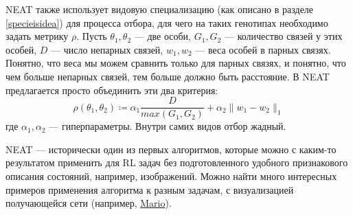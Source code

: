 \begin{example}
NEAT также использует видовую специализацию (как описано в разделе \ref{specieisidea}) для процесса отбора, для чего на таких генотипах необходимо задать метрику $\rho$. Пусть $\theta_1, \theta_2$ --- две особи, $G_1, G_2$ --- количество связей у этих особей, $D$ --- число непарных связей, $w_1, w_2$ --- веса особей в парных связях. Понятно, что веса мы можем сравнить только для парных связях, и понятно, что чем больше непарных связей, тем больше должно быть расстояние. В NEAT предлагается просто объединить эти два критерия: 
$$\rho(\theta_1, \theta_2) \coloneqq \alpha_1 \frac{D}{max(G_1, G_2)} + \alpha_2 \|w_1 - w_2\|_1$$
где $\alpha_1, \alpha_2$ --- гиперпараметры. Внутри самих видов отбор жадный.

NEAT --- исторически один из первых алгоритмов, которые можно с каким-то результатом применить для RL задач без подготовленного удобного признакового описания состояний, например, изображений. Можно найти много интересных примеров применения алгоритма к разным задачам, с визуализацией получающейся сети (например, \href{https://www.youtube.com/watch?v=qv6UVOQ0F44}{Mario}). 

\end{example}

